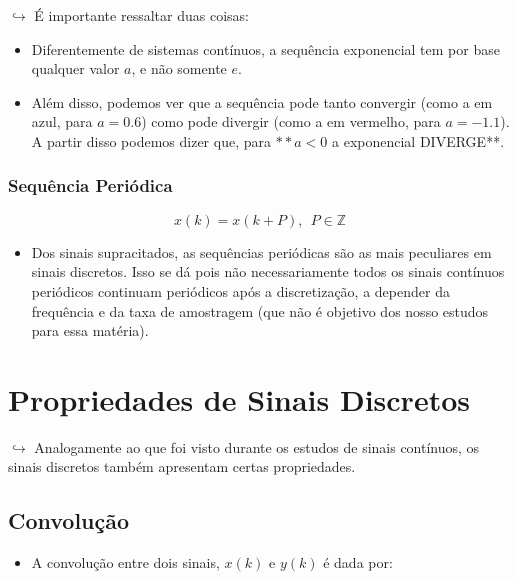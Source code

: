 \documentclass[]{article}
\providecommand{\tightlist}{%
  \setlength{\itemsep}{0pt}\setlength{\parskip}{0pt}}
\begin{document}
  \(\hookrightarrow\) É importante ressaltar duas coisas:

  \begin{itemize}
  \tightlist
  \item
    Diferentemente de sistemas contínuos, a sequência exponencial tem por
    base qualquer valor \(a\), e não somente \(e\).
  \item
    Além disso, podemos ver que a sequência pode tanto convergir (como a
    em azul, para \(a = 0.6\)) como pode divergir (como a em vermelho,
    para \(a = -1.1\)). A partir disso podemos dizer que, para \(**a<0\) a
    exponencial DIVERGE**.
  \end{itemize}

  \hypertarget{sequuxeancia-periuxf3dica}{%
  \subsubsection{Sequência Periódica}\label{sequuxeancia-periuxf3dica}}

  \[
  x(k) = x(k + P),  \ \ P\in \mathbb{Z}
  \]

  \begin{itemize}
  \tightlist
  \item
    Dos sinais supracitados, as sequências periódicas são as mais
    peculiares em sinais discretos. Isso se dá pois não necessariamente
    todos os sinais contínuos periódicos continuam periódicos após a
    discretização, a depender da frequência e da taxa de amostragem (que
    não é objetivo dos nosso estudos para essa matéria).
  \end{itemize}

  \hypertarget{propriedades-de-sinais-discretos}{%
  \section{Propriedades de Sinais
  Discretos}\label{propriedades-de-sinais-discretos}}

  \(\hookrightarrow\) Analogamente ao que foi visto durante os estudos de
  sinais contínuos, os sinais discretos também apresentam certas
  propriedades.

  \hypertarget{convoluuxe7uxe3o}{%
  \subsection{Convolução}\label{convoluuxe7uxe3o}}

  \begin{itemize}
  \tightlist
  \item
    A convolução entre dois sinais, \(x(k)\) e \(y(k)\) é dada por:
  \end{itemize}
\end{document}
